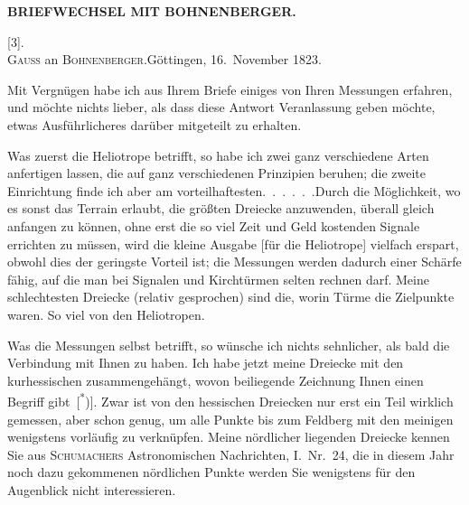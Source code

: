 \noindent{}\hfill{\small\textbf{BRIEFWECHSEL MIT BOHNENBERGER.}}\hfill\null\par\medskip

\begin{center}
[3].\\
\textsc{Gauss} an \textsc{Bohnenberger}.\quad Göttingen, 16.~November 1823.
\end{center}

\par\noindent\hspace*{\parindent}Mit Vergnügen habe ich aus Ihrem Briefe einiges von Ihren Messungen erfahren, und möchte nichts lieber, als dass diese Antwort Veranlassung geben möchte, etwas Ausführlicheres darüber mitgeteilt zu erhalten.

\par\noindent\hspace*{\parindent}Was zuerst die Heliotrope betrifft, so habe ich zwei ganz verschiedene Arten anfertigen lassen, die auf ganz verschiedenen Prinzipien beruhen; die zweite Einrichtung finde ich aber am vorteilhaftesten.\ \mbox{.\ .\ .\ .\ .}\quad Durch die Möglichkeit, wo es sonst das Terrain erlaubt, die größten Dreiecke anzuwenden, überall gleich anfangen zu können, ohne erst die so viel Zeit und Geld kostenden Signale errichten zu müssen, wird die kleine Ausgabe [für die Heliotrope] vielfach erspart, obwohl dies der geringste Vorteil ist; die Messungen werden dadurch einer Schärfe fähig, auf die man bei Signalen und Kirchtürmen selten rechnen darf.
Meine schlechtesten Dreiecke (relativ gesprochen) sind die, worin Türme die Zielpunkte waren.
So viel von den Heliotropen.

\par\noindent\hspace*{\parindent}Was die Messungen selbst betrifft, so wünsche ich nichts sehnlicher, als bald die Verbindung mit Ihnen zu haben.
Ich habe jetzt meine Dreiecke mit den kurhessischen zusammengehängt, wovon beiliegende Zeichnung Ihnen einen Begriff gibt~[\textsuperscript{*})].
Zwar ist von den hessischen Dreiecken nur erst ein Teil wirklich gemessen, aber schon genug, um alle Punkte bis zum Feldberg mit den meinigen wenigstens vorläufig zu verknüpfen.
Meine nördlicher liegenden Dreiecke kennen Sie aus \textsc{Schumachers} Astronomischen Nachrichten, I.~Nr.~24, die in diesem Jahr noch dazu gekommenen nördlichen Punkte werden Sie wenigstens für den Augenblick nicht interessieren.

